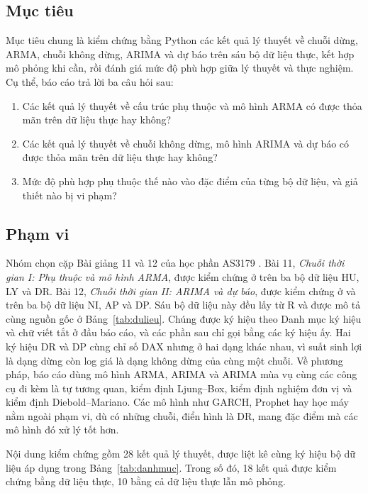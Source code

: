 \subsection{Mục tiêu}
Mục tiêu chung là kiểm chứng bằng Python các kết quả lý thuyết về chuỗi dừng, ARMA, chuỗi không dừng, ARIMA và dự báo trên sáu bộ dữ liệu thực, kết hợp mô phỏng khi cần, rồi đánh giá mức độ phù hợp giữa lý thuyết và thực nghiệm. Cụ thể, báo cáo trả lời ba câu hỏi sau:
\begin{enumerate}[label=\textbf{CH\arabic*.}]
	\item Các kết quả lý thuyết về cấu trúc phụ thuộc và mô hình ARMA có được thỏa mãn trên dữ liệu thực hay không?
	\item Các kết quả lý thuyết về chuỗi không dừng, mô hình ARIMA và dự báo có được thỏa mãn trên dữ liệu thực hay không?
	\item Mức độ phù hợp phụ thuộc thế nào vào đặc điểm của từng bộ dữ liệu, và giả thiết nào bị vi phạm?
\end{enumerate}

\subsection{Phạm vi}
Nhóm chọn cặp Bài giảng 11 và 12 của học phần AS3179 . Bài 11, \textit{Chuỗi thời gian I: Phụ thuộc và mô hình ARMA}, được kiểm chứng ở  trên ba bộ dữ liệu HU, LY và DR. Bài 12, \textit{Chuỗi thời gian II: ARIMA và dự báo}, được kiểm chứng ở  và  trên ba bộ dữ liệu NI, AP và DP. Sáu bộ dữ liệu này đều lấy từ R và được mô tả cùng nguồn gốc ở Bảng~\ref{tab:dulieu}. Chúng được ký hiệu theo Danh mục ký hiệu và chữ viết tắt ở đầu báo cáo, và các phần sau chỉ gọi bằng các ký hiệu ấy. Hai ký hiệu DR và DP cùng chỉ số DAX nhưng ở hai dạng khác nhau, vì suất sinh lợi là dạng dừng còn log giá là dạng không dừng của cùng một chuỗi.
Về phương pháp, báo cáo dùng mô hình ARMA, ARIMA và ARIMA mùa vụ cùng các công cụ đi kèm là tự tương quan, kiểm định Ljung--Box, kiểm định nghiệm đơn vị và kiểm định Diebold--Mariano. Các mô hình như GARCH, Prophet hay học máy nằm ngoài phạm vi, dù có những chuỗi, điển hình là DR, mang đặc điểm mà các mô hình đó xử lý tốt hơn.

Nội dung kiểm chứng gồm 28 kết quả lý thuyết, được liệt kê cùng ký hiệu bộ dữ liệu áp dụng trong Bảng~\ref{tab:danhmuc}. Trong số đó, 18 kết quả được kiểm chứng bằng dữ liệu thực, 10 bằng cả dữ liệu thực lẫn mô phỏng.

